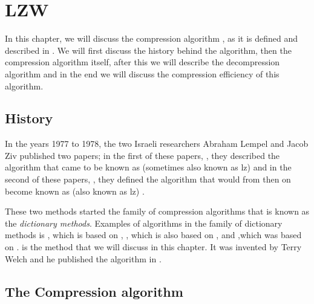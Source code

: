 \begin{comment}
  
\end{comment}

\chapter{LZW}
\label{cha:lzw}

In this chapter, we will discuss the compression algorithm \lzw, as it
is defined and described in
\cite{Nelson:1989:LDC:77102.77104,Welch:1984:THD:1319729.1320134,Salomon:2004:DCC,mark1996data_compression_book,nelson:_lzw_revis}. We
will first discuss the history behind the algorithm, then the
compression algorithm itself, after this we will describe the
decompression algorithm and in the end we will discuss the compression
efficiency of this algorithm.

\section{History}
\label{sec:hist-lzw}

\newcommand*{\lzonev}{{\acronymstyle lz\oldstylenums{1}}\xspace}
\newcommand*{\lztwov}{{\acronymstyle lz\oldstylenums{2}}\xspace}

In the years 1977 to 1978, the two Israeli researchers Abraham Lempel
and Jacob Ziv published two papers; in the first of these papers,
\cite{Ziv77auniversal}, they described the algorithm that came to be
known as \lzone(sometimes also known as \lzonev) and in the second of
these papers, \cite{Ziv78compressionof}, they defined the algorithm
that would from then on become known as \lztwo(also known as \lztwov)
\cite{roelofs09:_histor_portab_networ_graph_png_format,Salomon:2004:DCC,winters:_us_paten_adapt}.

These two methods started the family of compression algorithms that is
known as the \textit{dictionary methods}. Examples of algorithms in
the family of dictionary methods is \lzma, which is based on \lztwo
\cite{palov11}, \lzw, which is also based on \lztwo, and \lzss,which
was based on \lzone \cite{Salomon:2004:DCC}. \lzw is the method that
we will discuss in this chapter. It was invented by Terry Welch and he
published the algorithm in \cite{welch85:_u}.

\section{The Compression algorithm}
\label{sec:lzw-comp-desc}

